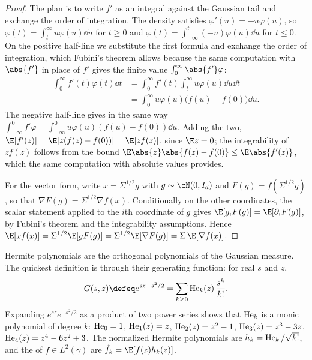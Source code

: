 \begin{refsection}
\begin{proof}
The plan is to write $f'$ as an integral against the Gaussian tail and exchange the order of integration. The density satisfies $\varphi'(u)=-u\varphi(u)$, so $\varphi(t)=\int_t^\infty u\varphi(u)\dd u$ for $t\ge0$ and $\varphi(t)=\int_{-\infty}^t(-u)\varphi(u)\dd u$ for $t\le0$. On the positive half-line we substitute the first formula and exchange the order of integration, which Fubini's theorem allows because the same computation with $\abs{f'}$ in place of $f'$ gives the finite value $\int_0^\infty\abs{f'}\varphi$:
\begin{align*}
  \int_0^\infty f'(t)\varphi(t)\dd t&=\int_0^\infty f'(t)\int_t^\infty u\varphi(u)\dd u\dd t\\
  &=\int_0^\infty u\varphi(u)\big(f(u)-f(0)\big)\dd u .
\end{align*} The negative half-line gives in the same way $\int_{-\infty}^0f'\varphi=\int_{-\infty}^0u\varphi(u)(f(u)-f(0))\dd u$. Adding the two, $\E[f'(z)]=\E[z(f(z)-f(0))]=\E[zf(z)]$, since $\E z=0$; the integrability of $zf(z)$ follows from the bound $\E\abs{z}\abs{f(z)-f(0)}\le\E\abs{f'(z)}$, which the same computation with absolute values provides.

For the vector form, write $x=\Sigma^{1/2}g$ with $g\sim\cN(0,I_d)$ and $F(g)=f(\Sigma^{1/2}g)$, so that $\nabla F(g)=\Sigma^{1/2}\nabla f(x)$. Conditionally on the other coordinates, the scalar statement applied to the $i$th coordinate of $g$ gives $\E[g_iF(g)]=\E[\partial_iF(g)]$, by Fubini's theorem and the integrability assumptions. Hence $\E[xf(x)]=\Sigma^{1/2}\E[gF(g)]=\Sigma^{1/2}\E[\nabla F(g)]=\Sigma\,\E[\nabla f(x)]$.
\end{proof}

Hermite polynomials are the orthogonal polynomials of the Gaussian measure. The quickest definition is through their generating function: for real $s$ and $z$,
\begin{equation}\label{eq:toolkit:genfun}
  G(s,z)\defeq e^{sz-s^2/2}=\sum_{k\ge0}\He_k(z)\,\frac{s^k}{k!}.
\end{equation}
Expanding $e^{sz}e^{-s^2/2}$ as a product of two power series shows that $\operatorname{He}_k$ is a monic polynomial of degree $k$: $\operatorname{He}_0=1$, $\operatorname{He}_1(z)=z$, $\operatorname{He}_2(z)=z^2-1$, $\operatorname{He}_3(z)=z^3-3z$, $\operatorname{He}_4(z)=z^4-6z^2+3$. The normalized Hermite polynomials are $h_k=\operatorname{He}_k/\sqrt{k!}$, and the  of $f\in L^2(\gamma)$ are $\hat f_k=\E[f(z)h_k(z)]$.


\end{refsection}
